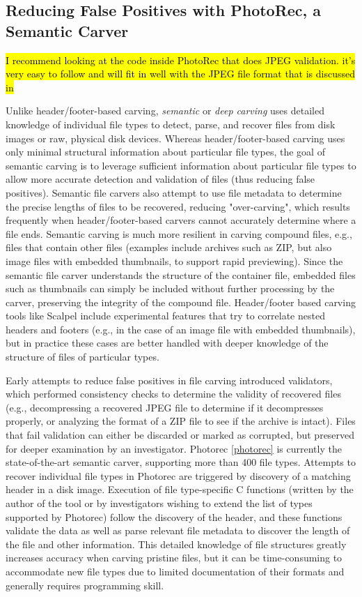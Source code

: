 \subsection{Reducing False Positives with PhotoRec, a Semantic Carver}

\hl{I recommend looking at the code inside PhotoRec that does JPEG
  validation. it's very easy to follow and will fit in well with the
  JPEG file format that is discussed in} 

Unlike header/footer-based carving, \emph{semantic} or \emph{deep carving} uses detailed knowledge of individual file types to detect, parse, and recover files from disk images or raw, physical disk devices.  Whereas header/footer-based carving uses only minimal structural information about particular file types, the goal of semantic carving is to leverage sufficient information about particular file types to allow more accurate detection and validation of files (thus reducing false positives).   Semantic file carvers also attempt to use file metadata to determine the precise lengths of files to be recovered, reducing "over-carving", which results frequently when header/footer-based carvers cannot accurately determine where a file ends.  Semantic carving is much more resilient in carving compound files, e.g., files that contain other files (examples include archives such as ZIP, but also image files with embedded thumbnails, to support rapid previewing).  Since the semantic file carver understands the structure of the container file, embedded files such as thumbnails can simply be included without further processing by the carver, preserving the integrity of the compound file.   Header/footer based carving tools like Scalpel include experimental features that try to correlate nested headers and footers (e.g., in the case of an image file with embedded thumbnails), but in practice these cases are better handled with deeper knowledge of the structure of files of particular types.

Early attempts to reduce false positives in file carving introduced validators, which performed consistency checks to determine the validity of recovered files (e.g., decompressing a recovered JPEG file to determine if it decompresses properly, or analyzing the format of a ZIP file to see if the archive is intact).  Files that fail validation can either be discarded or marked as corrupted, but preserved for deeper examination by an investigator.  Photorec \ref{photorec} is currently the state-of-the-art semantic carver, supporting more than 400 file types.  Attempts to recover individual file types in Photorec are triggered by discovery of a matching header in a disk image.  Execution of file type-specific C functions (written by the author of the tool or by investigators wishing to extend the list of types supported by Photorec) follow the discovery of the header, and these functions validate the data as well as parse relevant file metadata to discover the length of the file and other information.  This detailed knowledge of file structures greatly increases accuracy when carving pristine files, but it can be time-consuming to accommodate new file
types due to limited documentation of their formats and generally requires programming skill.

